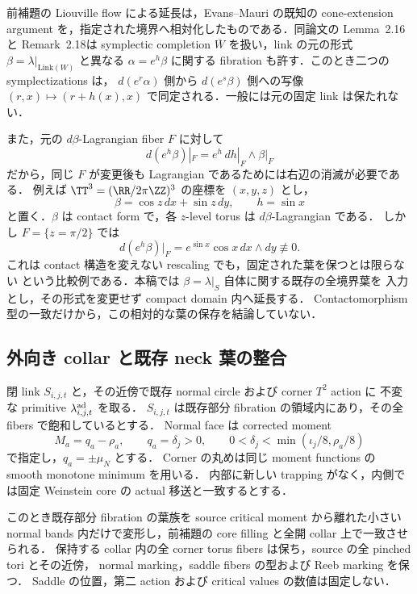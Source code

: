 \begin{remark}
\label{ke:contact-rescaling-collar-scope}
前補題の Liouville flow による延長は，Evans--Mauri の既知の cone-extension
argument を，指定された境界へ相対化したものである．同論文の
Lemma~2.16 と Remark~2.18\cite[pp.~543--544]{EM}は symplectic completion
$\overline W$ を扱い，link の元の形式 $\beta=\lambda|_{\mathrm{Link}(W)}$ と異なる
$\alpha=e^h\beta$ に関する fibration も許す．このとき二つの symplectizations は，
$d(e^r\alpha)$ 側から $d(e^s\beta)$ 側への写像
$(r,x)\mapsto(r+h(x),x)$ で同定される．一般には元の固定 link は保たれない．

また，元の $d\beta$-Lagrangian fiber $F$ に対して
\[
 d(e^h\beta)|_F=e^h\,dh|_F\wedge\beta|_F
\]
だから，同じ $F$ が変更後も Lagrangian であるためには右辺の消滅が必要である．
例えば $\TT^3=(\RR/2\pi\ZZ)^3$ の座標を $(x,y,z)$ とし，
\[
 \beta=\cos z\,dx+\sin z\,dy,\qquad h=\sin x
\]
と置く．$\beta$ は contact form で，各 $z$-level torus は $d\beta$-Lagrangian である．
しかし $F=\{z=\pi/2\}$ では
\[
 d(e^h\beta)|_F=e^{\sin x}\cos x\,dx\wedge dy\not\equiv0 .
\]
これは contact 構造を変えない rescaling でも，固定された葉を保つとは限らない
という比較例である．本稿では $\beta=\lambda|_S$ 自体に関する既存の全境界葉を
入力とし，その形式を変更せず compact domain 内へ延長する．
Contactomorphism 型の一致だけから，この相対的な葉の保存を結論していない．
\end{remark}

\subsection{外向き collar と既存 neck 葉の整合}

\begin{proposition}
\label{ke:link-relative-collar-gluing}
閉 link $S_{i,j,t}$ と，その近傍で既存 normal circle および corner $T^2$ action に
不変な primitive $\lambda^{\rm ad}_{i,j,t}$ を取る．
$S_{i,j,t}$ は既存部分 fibration の領域内にあり，その全 fibers で飽和しているとする．
Normal face は corrected moment
\[
 M_a=q_a-\rho_a,\qquad q_a=\delta_j>0,\qquad
 0<\delta_j<\min(\iota_j/8,\rho_a/8)
\]
で指定し，$q_a=\pm\widehat\mu_N$ とする．
Corner の丸めは同じ moment functions の smooth monotone minimum を用いる．
内部に新しい trapping がなく，内側では固定 Weinstein core の actual 移送と一致するとする．

このとき既存部分 fibration の葉族を source critical moment から離れた小さい
normal bands 内だけで変形し，前補題の core filling と全開 collar 上で一致させられる．
保持する collar 内の全 corner torus fibers は保ち，source の全 pinched tori とその近傍，
normal marking，saddle fibers の型および Reeb marking を保つ．
Saddle の位置，第二 action および critical values の数値は固定しない．
\end{proposition}

